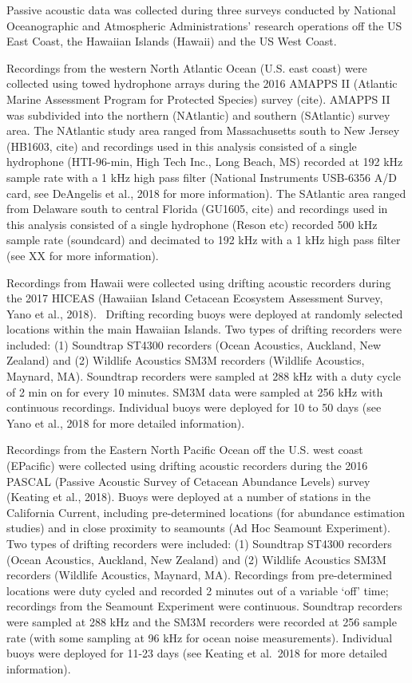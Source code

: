 \documentclass[
  authoryear,
  preprint,
  3p]{elsarticle}
\begin{document}
Passive acoustic data was collected during three surveys conducted by
National Oceanographic and Atmospheric Administrations' research
operations off the US East Coast, the Hawaiian Islands (Hawaii) and the
US West Coast.

Recordings from the western North Atlantic Ocean (U.S. east coast) were
collected using towed hydrophone arrays during the 2016 AMAPPS II
(Atlantic Marine Assessment Program for Protected Species) survey
(cite). AMAPPS II was subdivided into the northern (NAtlantic) and
southern (SAtlantic) survey area. The NAtlantic study area ranged from
Massachusetts south to New Jersey (HB1603, cite) and recordings used in
this analysis consisted of a single hydrophone (HTI-96-min, High Tech
Inc., Long Beach, MS) recorded at 192 kHz sample rate with a 1 kHz high
pass filter (National Instruments USB-6356 A/D card, see DeAngelis et
al., 2018 for more information). The SAtlantic area ranged from Delaware
south to central Florida (GU1605, cite) and recordings used in this
analysis consisted of a single hydrophone (Reson etc) recorded 500 kHz
sample rate (soundcard) and decimated to 192 kHz with a 1 kHz high pass
filter (see XX for more information).

Recordings from Hawaii were collected using drifting acoustic recorders
during the 2017 HICEAS (Hawaiian Island Cetacean Ecosystem Assessment
Survey, Yano et al., 2018).~ Drifting recording buoys were deployed at
randomly selected locations within the main Hawaiian Islands. Two types
of drifting recorders were included: (1) Soundtrap ST4300 recorders
(Ocean Acoustics, Auckland, New Zealand) and (2) Wildlife Acoustics SM3M
recorders (Wildlife Acoustics, Maynard, MA). Soundtrap recorders were
sampled at 288 kHz with a duty cycle of 2 min on for every 10 minutes.
SM3M data were sampled at 256 kHz with continuous recordings. Individual
buoys were deployed for 10 to 50 days (see Yano et al., 2018 for more
detailed information).

Recordings from the Eastern North Pacific Ocean off the U.S. west coast
(EPacific) were collected using drifting acoustic recorders during the
2016 PASCAL (Passive Acoustic Survey of Cetacean Abundance Levels)
survey (Keating et al., 2018). Buoys were deployed at a number of
stations in the California Current, including pre-determined locations
(for abundance estimation studies) and in close proximity to seamounts
(Ad Hoc Seamount Experiment). Two types of drifting recorders were
included: (1) Soundtrap ST4300 recorders (Ocean Acoustics, Auckland, New
Zealand) and (2) Wildlife Acoustics SM3M recorders (Wildlife Acoustics,
Maynard, MA). Recordings from pre-determined locations were duty cycled
and recorded 2 minutes out of a variable `off' time; recordings from the
Seamount Experiment were continuous. Soundtrap recorders were sampled at
288 kHz and the SM3M recorders were recorded at 256 sample rate (with
some sampling at 96 kHz for ocean noise measurements). Individual buoys
were deployed for 11-23 days (see Keating et al.~2018 for more detailed
information).
\end{document}
